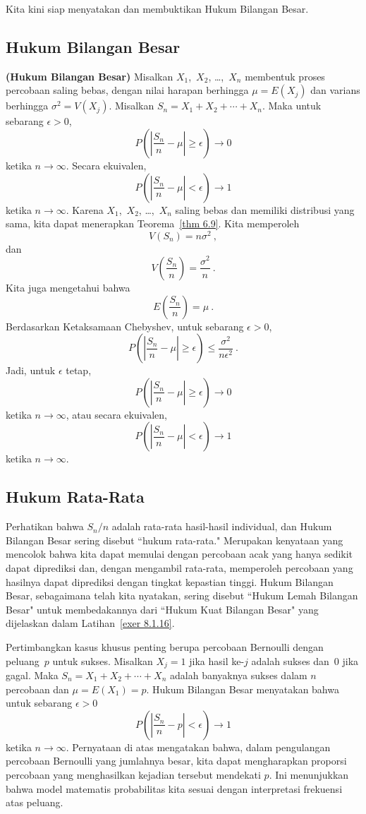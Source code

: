 Kita kini siap menyatakan dan membuktikan Hukum Bilangan Besar.

\subsection*{Hukum Bilangan Besar}
\begin{theorem}{\bf (Hukum Bilangan Besar)}
Misalkan $X_1$,~$X_2$, \dots,~$X_n$ membentuk proses percobaan saling bebas, dengan
nilai harapan berhingga $\mu = E(X_j)$ dan varians berhingga $\sigma^2 =
V(X_j)$.  Misalkan $S_n = X_1 + X_2 +\cdots+ X_n$.  Maka untuk
sebarang $\epsilon > 0$, 
$$ P\left( \left| \frac {S_n}n - \mu \right| \geq \epsilon
\right) \to 0
$$
ketika $n \rightarrow \infty$.
Secara ekuivalen,
$$
P\left( \left| \frac {S_n}n - \mu \right| < \epsilon \right) \to 1
$$
ketika $n \rightarrow \infty$.
\proof
Karena $X_1$,~$X_2$, \dots,~$X_n$ saling bebas dan memiliki distribusi yang sama,
kita dapat menerapkan Teorema~\ref{thm 6.9}.  Kita memperoleh
$$
V(S_n) = n\sigma^2\ ,
$$
dan
$$
V (\frac {S_n}n) = \frac {\sigma^2}n\ .
$$
Kita juga mengetahui bahwa
$$
E (\frac {S_n}n) = \mu\ .
$$
Berdasarkan Ketaksamaan Chebyshev, untuk sebarang $\epsilon > 0$,
$$
P\left( \left| \frac {S_n}n - \mu \right| \geq \epsilon \right) \leq \frac
{\sigma^2}{n\epsilon^2}\ .
$$
Jadi, untuk $\epsilon$ tetap,
$$
P\left( \left| \frac {S_n}n - \mu \right| \geq \epsilon \right) \to 0
$$
ketika $n \rightarrow \infty$, atau secara ekuivalen,
$$
P\left( \left| \frac {S_n}n - \mu \right| < \epsilon \right) \to 1
$$
ketika $n \rightarrow \infty$.
\end{theorem}

\subsection*{Hukum Rata-Rata}
Perhatikan bahwa $S_n/n$ adalah rata-rata hasil-hasil individual, dan Hukum
Bilangan Besar sering disebut ``hukum rata-rata."  Merupakan kenyataan yang mencolok
bahwa kita dapat memulai dengan percobaan acak yang hanya sedikit dapat diprediksi
dan, dengan mengambil rata-rata, memperoleh percobaan yang hasilnya dapat
diprediksi dengan tingkat kepastian tinggi.  Hukum Bilangan Besar, sebagaimana
telah kita nyatakan, sering disebut ``Hukum Lemah Bilangan Besar" untuk
membedakannya dari ``Hukum Kuat Bilangan Besar" yang dijelaskan dalam
Latihan~\ref{exer 8.1.16}.

Pertimbangkan kasus khusus penting berupa percobaan Bernoulli dengan peluang~$p$
untuk sukses.  Misalkan $X_j = 1$ jika hasil ke-$j$ adalah sukses dan~0 jika
gagal.  Maka $S_n = X_1 + X_2 +\cdots+ X_n$ adalah banyaknya sukses dalam $n$
percobaan dan $\mu = E(X_1) = p$.  Hukum Bilangan Besar menyatakan bahwa untuk sebarang
$\epsilon > 0$
$$
P\left( \left| \frac {S_n}n - p \right| < \epsilon \right) \to 1
$$
ketika $n \rightarrow \infty$.  Pernyataan di atas mengatakan bahwa, dalam pengulangan
percobaan Bernoulli yang jumlahnya besar, kita dapat mengharapkan proporsi percobaan yang
menghasilkan kejadian tersebut mendekati $p$.  Ini menunjukkan bahwa model matematis probabilitas kita
sesuai dengan interpretasi frekuensi atas peluang.  

